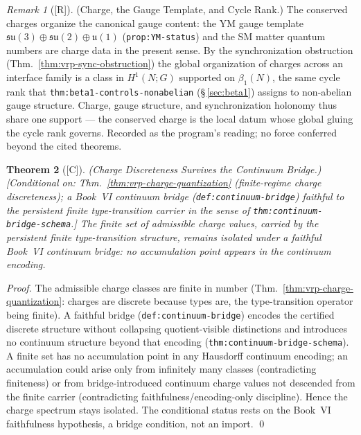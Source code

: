 \documentclass[12pt,oneside]{amsbook}
\theoremstyle{plain}
\newtheorem{theorem}{Theorem}[section]
\theoremstyle{definition}
\theoremstyle{remark}
\newtheorem{remark}[theorem]{Remark}
\newcommand{\status}[1]{\textup{[#1]}}
\begin{document}
\begin{remark}[\status{R}]\label{rmk:vrp-charge-gauge}
\textup{(Charge, the Gauge Template, and Cycle Rank.)}
The conserved charges organize the canonical gauge content: the YM
gauge template $\mathfrak{su}(3)\oplus\mathfrak{su}(2)\oplus
\mathfrak{u}(1)$ (\texttt{prop:YM-status}) and the SM matter quantum
numbers are charge data in the present sense.  By the synchronization
obstruction (Thm.~\ref{thm:vrp-sync-obstruction}) the global
organization of charges across an interface family is a class in
$H^1(N;G)$ supported on $\beta_1(N)$, the same cycle rank that
\texttt{thm:beta1-controls-nonabelian} (\S\,\ref{sec:beta1}) assigns to
non-abelian gauge structure.  Charge, gauge structure, and
synchronization holonomy thus share one support --- the conserved
charge is the local datum whose global gluing the cycle rank governs.
Recorded as the program's reading; no force conferred beyond the cited
theorems.
\end{remark}

\begin{theorem}[\status{C}]\label{thm:vrp-charge-continuum-survival}
\textup{(Charge Discreteness Survives the Continuum Bridge.)}
\textup{[Conditional on: Thm.~\ref{thm:vrp-charge-quantization}
(finite-regime charge discreteness); a Book~VI continuum bridge
(\texttt{def:continuum-bridge}) faithful to the persistent finite
type-transition carrier in the sense of \texttt{thm:continuum-bridge-schema}.]}
The finite set of admissible charge values, carried by the persistent
finite type-transition structure, remains isolated under a faithful
Book~VI continuum bridge: no accumulation point appears in the continuum
encoding.
\end{theorem}

\begin{proof}
The admissible charge classes are finite in number
(Thm.~\ref{thm:vrp-charge-quantization}: charges are discrete because
types are, the type-transition operator being finite). A faithful bridge
(\texttt{def:continuum-bridge}) encodes the certified discrete structure
without collapsing quotient-visible distinctions and introduces no
continuum structure beyond that encoding
(\texttt{thm:continuum-bridge-schema}). A finite set has no accumulation
point in any Hausdorff continuum encoding; an accumulation could arise
only from infinitely many classes (contradicting finiteness) or from
bridge-introduced continuum charge values not descended from the finite
carrier (contradicting faithfulness/encoding-only discipline). Hence the
charge spectrum stays isolated. The conditional status rests on the
Book~VI faithfulness hypothesis, a bridge condition, not an import. \qed
\end{proof}
\end{document}
